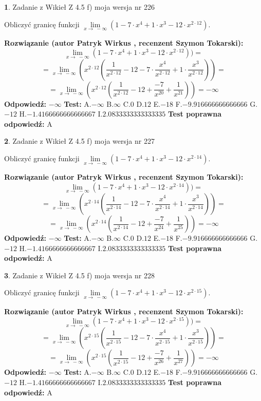 \documentclass[12pt, a4paper]{article}
\theoremstyle{definition} %
\newtheorem{zad}{}
\newcommand{\zadStart}[1]{\begin{zad}#1\newline}
\newcommand{\zadStop}{\end{zad}}
\newcommand{\rozwStart}[2]{\noindent \textbf{Rozwiązanie (autor #1 , recenzent #2): }\newline}
\newcommand{\rozwStop}{\newline}
\newcommand{\odpStart}{\noindent \textbf{Odpowiedź:}\newline}
\newcommand{\odpStop}{\newline}
\newcommand{\testStart}{\noindent \textbf{Test:}\newline}
\newcommand{\testStop}{\newline}
\newcommand{\kluczStart}{\noindent \textbf{Test poprawna odpowiedź:}\newline}
\newcommand{\kluczStop}{\newline}
\begin{document}
\zadStart{Zadanie z Wikieł Z 4.5 f) moja wersja nr 226}


Obliczyć granicę funkcji  $\lim\limits_{x\to\ -\infty}(1 - 7 \cdot x^{4}+1 \cdot x^{3}- 12 \cdot x^{2\cdot12})$.
\zadStop
\rozwStart{Patryk Wirkus}{Szymon Tokarski}
$$\lim\limits_{x\to\ -\infty}(1 - 7 \cdot x^{4}+1 \cdot x^{3}- 12 \cdot x^{2\cdot12}))=$$
$$=\lim\limits_{x\to\ -\infty}(x^{2\cdot12}(\frac{1}{x^{2\cdot12}}-12 -7 \cdot \frac{x^{4}}{x^{2\cdot12}}+1 \cdot \frac{x^{3}}{x^{2\cdot12}}))=$$
$$=\lim\limits_{x\to\ -\infty}(x^{2\cdot12}(\frac{1}{x^{2\cdot12}}-12 + \frac{-7}{x^{20}}+ \frac{1}{x^{21}}))=-\infty$$
\rozwStop
\odpStart
$-\infty$
\odpStop
\testStart
A.$-\infty$ B.$\infty$ C.$0$ D.$12$ E.$-18$
F.$-9.916666666666666$ G.$-12$
H.$-1.4166666666666667$
I.$2.0833333333333335$
\testStop
\kluczStart
A
\kluczStop



\zadStart{Zadanie z Wikieł Z 4.5 f) moja wersja nr 227}


Obliczyć granicę funkcji  $\lim\limits_{x\to\ -\infty}(1 - 7 \cdot x^{4}+1 \cdot x^{3}- 12 \cdot x^{2\cdot14})$.
\zadStop
\rozwStart{Patryk Wirkus}{Szymon Tokarski}
$$\lim\limits_{x\to\ -\infty}(1 - 7 \cdot x^{4}+1 \cdot x^{3}- 12 \cdot x^{2\cdot14}))=$$
$$=\lim\limits_{x\to\ -\infty}(x^{2\cdot14}(\frac{1}{x^{2\cdot14}}-12 -7 \cdot \frac{x^{4}}{x^{2\cdot14}}+1 \cdot \frac{x^{3}}{x^{2\cdot14}}))=$$
$$=\lim\limits_{x\to\ -\infty}(x^{2\cdot14}(\frac{1}{x^{2\cdot14}}-12 + \frac{-7}{x^{24}}+ \frac{1}{x^{25}}))=-\infty$$
\rozwStop
\odpStart
$-\infty$
\odpStop
\testStart
A.$-\infty$ B.$\infty$ C.$0$ D.$12$ E.$-18$
F.$-9.916666666666666$ G.$-12$
H.$-1.4166666666666667$
I.$2.0833333333333335$
\testStop
\kluczStart
A
\kluczStop



\zadStart{Zadanie z Wikieł Z 4.5 f) moja wersja nr 228}


Obliczyć granicę funkcji  $\lim\limits_{x\to\ -\infty}(1 - 7 \cdot x^{4}+1 \cdot x^{3}- 12 \cdot x^{2\cdot15})$.
\zadStop
\rozwStart{Patryk Wirkus}{Szymon Tokarski}
$$\lim\limits_{x\to\ -\infty}(1 - 7 \cdot x^{4}+1 \cdot x^{3}- 12 \cdot x^{2\cdot15}))=$$
$$=\lim\limits_{x\to\ -\infty}(x^{2\cdot15}(\frac{1}{x^{2\cdot15}}-12 -7 \cdot \frac{x^{4}}{x^{2\cdot15}}+1 \cdot \frac{x^{3}}{x^{2\cdot15}}))=$$
$$=\lim\limits_{x\to\ -\infty}(x^{2\cdot15}(\frac{1}{x^{2\cdot15}}-12 + \frac{-7}{x^{26}}+ \frac{1}{x^{27}}))=-\infty$$
\rozwStop
\odpStart
$-\infty$
\odpStop
\testStart
A.$-\infty$ B.$\infty$ C.$0$ D.$12$ E.$-18$
F.$-9.916666666666666$ G.$-12$
H.$-1.4166666666666667$
I.$2.0833333333333335$
\testStop
\kluczStart
A
\kluczStop
\end{document}
